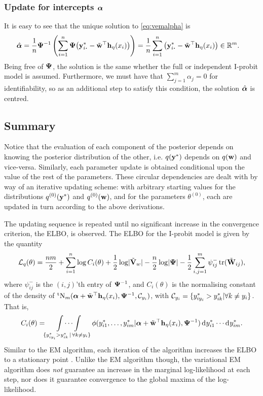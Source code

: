 \subsubsection{Update for intercepts \texorpdfstring{$\balpha$}{$\alpha$}}

It is easy to see that the unique solution to \cref{eq:vemalpha} is
\begin{align*}
  \hat\balpha
  &= \frac{1}{n} \bPsi^{-1} \left( \sum_{i=1}^n \bPsi \big(\by_{i\bigcdot}^* - \tilde\bw^\top\bh_\eta(x_i) \big) \right) 
  =\frac{1}{n} \sum_{i=1}^n \big(\by_{i\bigcdot}^* - \tilde\bw^\top\bh_\eta(x_i) \big) \in \bbR^m.
\end{align*}
Being free of $\bPsi$, the solution is the same whether the full or independent I-probit model is assumed.
Furthermore, we must have that $\sum_{j=1}^m \alpha_j = 0$ for identifiability, so as an additional step to satisfy this condition, the solution $\hat\balpha$ is centred.

\subsection{Summary}

Notice that the evaluation of each component of the posterior depends on knowing the posterior distribution of the other, i.e. $q(\by^*)$ depends on $q(\bw)$ and vice-versa.
Similarly, each parameter update is obtained conditional upon the value of the rest of the parameters.
These circular dependencies are dealt with by way of an iterative updating scheme: with arbitrary starting values for the distributions $q^{(0)}(\by^*)$ and $q^{(0)}(\bw)$, and for the parameters $\theta^{(0)}$, each are updated in turn according to the above derivations.

The updating sequence is repeated until no significant increase in the convergence criterion, the ELBO, is observed.
The ELBO for the I-probit model is given by the quantity
\begin{align}
  \cL_q(\theta) = \half[nm] + \sum_{i=1}^n \log C_i(\theta) + \half\log \abs{\tilde\bV_w} - \half[n]\log\abs{\bPsi} - \half\sum_{i,j=1}^m \psi_{ij}^- \tr(\tilde\bW_{ij}),
\end{align}
where $\psi_{ij}^{-}$ is the $(i,j)$'th entry of $\bPsi^{-1}$, and $C_i(\theta)$ is the normalising constant of the density of $\tN_m(\balpha + \tilde\bw^\top\bh_\eta(x_i),\bPsi^{-1},\cC_{y_i})$, with $\cC_{y_i} = \{y_{iy_i}^* > y_{ik}^* | \forall k \neq y_i \}$.
That is,
\[
  C_i(\theta) = \idotsint\displaylimits_{\{y_{iy_i}^* > y_{ik}^* \,|\, \forall k \neq y_i \}} \phi(y_{i1}^*, \dots, y_{im}^*|\balpha + \tilde\bw^\top\bh_\eta(x_i), \bPsi^{-1}) \dint y_{i1}^* \cdots \dint y_{im}^*.
\]
Similar to the EM algorithm, each iteration of the algorithm increases the ELBO to a stationary point \citep{blei2017variational}.
Unlike the EM algorithm though, the variational EM algorithm does \emph{not} guarantee an increase in the marginal log-likelihood at each step, nor does it guarantee convergence to the global maxima of the log-likelihood.

